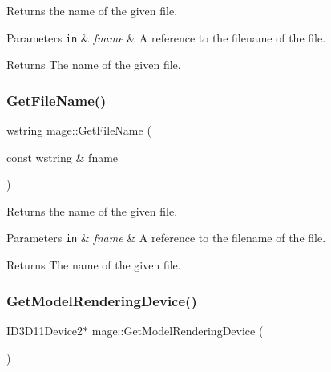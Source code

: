 Returns the name of the given file.


\begin{DoxyParams}[1]{Parameters}
\mbox{\tt in}  & {\em fname} & A reference to the filename of the file. \\
\hline
\end{DoxyParams}
\begin{DoxyReturn}{Returns}
The name of the given file. 
\end{DoxyReturn}
\hypertarget{namespacemage_a04f348f48418c554940a817835b7a0c4}{}\label{namespacemage_a04f348f48418c554940a817835b7a0c4} 
\subsubsection{\texorpdfstring{Get\+File\+Name()}{GetFileName()}\hspace{0.1cm}{\footnotesize\ttfamily [2/2]}}
{\footnotesize\ttfamily wstring mage\+::\+Get\+File\+Name (\begin{DoxyParamCaption}\item[{const wstring \&}]{fname }\end{DoxyParamCaption})}

Returns the name of the given file.


\begin{DoxyParams}[1]{Parameters}
\mbox{\tt in}  & {\em fname} & A reference to the filename of the file. \\
\hline
\end{DoxyParams}
\begin{DoxyReturn}{Returns}
The name of the given file. 
\end{DoxyReturn}
\hypertarget{namespacemage_aca16dcb4637f074bb6e33d4ba7929686}{}\label{namespacemage_aca16dcb4637f074bb6e33d4ba7929686} 
\subsubsection{\texorpdfstring{Get\+Model\+Rendering\+Device()}{GetModelRenderingDevice()}}
{\footnotesize\ttfamily I\+D3\+D11\+Device2$\ast$ mage\+::\+Get\+Model\+Rendering\+Device (\begin{DoxyParamCaption}{ }\end{DoxyParamCaption})}

